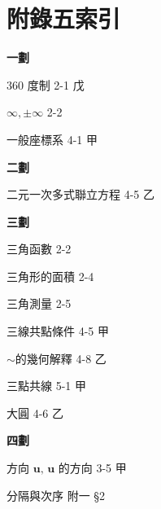 \section*{附錄五\quad 索\qquad 引}
\label{sec:b3_a5}

\setlength{\columnsep}{2em}
\begin{multicols}{2}

\begin{center}
\textbf{\large 一\quad 劃}
\end{center}

\noindent $360\text{ 度制}$ \hfill 2-1 戊\par
\noindent $\infty, \pm\infty$ \hfill 2-2\par
\noindent 一般座標系 \hfill 4-1 甲\par

\vspace{0.8em}
\begin{center}
\textbf{\large 二\quad 劃}
\end{center}

\noindent 二元一次多式聯立方程 \hfill 4-5 乙\par

\vspace{0.8em}
\begin{center}
\textbf{\large 三\quad 劃}
\end{center}

\noindent 三角函數 \hfill 2-2\par
\noindent 三角形的面積 \hfill 2-4\par
\noindent 三角測量 \hfill 2-5\par
\noindent 三線共點條件 \hfill 4-5 甲\par
\noindent\hspace*{1.5em} $\sim$的幾何解釋 \hfill 4-8 乙\par
\noindent 三點共線 \hfill 5-1 甲\par
\noindent 大圓 \hfill 4-6 乙\par

\vspace{0.8em}
\begin{center}
\textbf{\large 四\quad 劃}
\end{center}

\noindent 方向 $\boldsymbol{u},\, \boldsymbol{u}\text{ 的方向}$ \hfill 3-5 甲\par
\noindent 分隔與次序 \hfill 附一 \S 2\par


\end{multicols}
